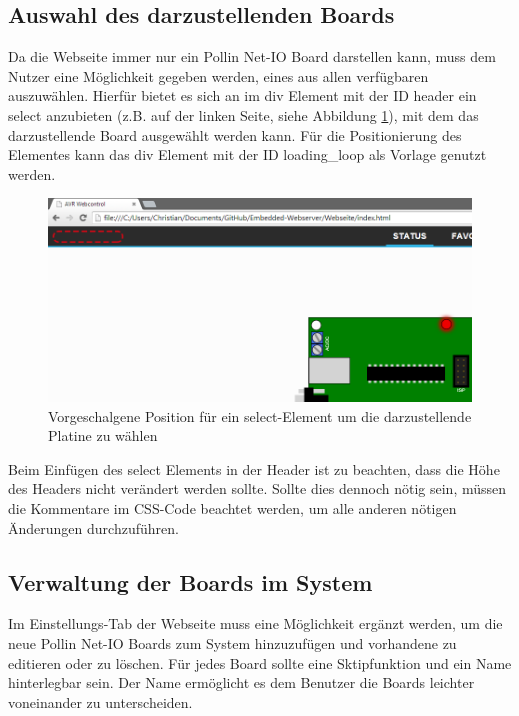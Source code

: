 \subsection{Auswahl des darzustellenden Boards}
\label{auswahl_board}
Da die Webseite immer nur ein Pollin Net-IO Board darstellen kann, muss dem
Nutzer eine Möglichkeit gegeben werden, eines aus allen verfügbaren auszuwählen.
Hierfür bietet es sich an im \textrm{div} Element mit der ID \textrm{header}
ein \textrm{select} anzubieten (z.B. auf der linken Seite, siehe
Abbildung \ref{select_board}), mit dem das darzustellende Board ausgewählt
werden kann.
Für die Positionierung des Elementes kann das \textrm{div} Element mit der ID
\textrm{loading\_loop} als Vorlage genutzt werden.

\begin{figure}[H]
\centering
\includegraphics[width=13cm]{content/pictures/select_board.png}
\caption{Vorgeschalgene Position für ein select-Element um die darzustellende
Platine zu wählen}
\label{select_board}
\end{figure}

Beim Einfügen des \textrm{select} Elements in der Header ist zu beachten, dass die
Höhe des Headers nicht verändert werden sollte. Sollte dies dennoch nötig sein,
müssen die Kommentare im CSS-Code beachtet werden, um alle anderen nötigen
Änderungen durchzuführen.

\subsection{Verwaltung der Boards im System}
\label{verwaltung_system}
Im Einstellungs-Tab der Webseite muss eine Möglichkeit ergänzt werden, um die
neue Pollin Net-IO Boards zum System hinzuzufügen und vorhandene zu editieren
oder zu löschen. Für jedes Board sollte eine Sktipfunktion und ein Name
hinterlegbar sein. Der Name ermöglicht es dem Benutzer die Boards leichter
voneinander zu unterscheiden.

